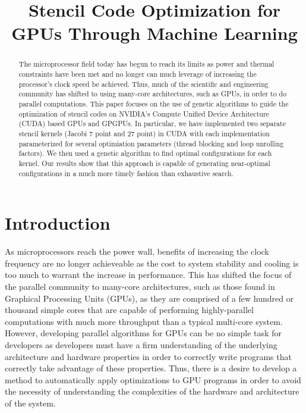 \documentclass[conference]{IEEEtran}
\begin{document}


\title{Stencil Code Optimization for GPUs Through Machine Learning}
\author{
}
\maketitle

\begin{abstract}
	The microprocessor field today has begun to reach its limits as power and thermal constraints have been met and no longer can much leverage of increasing the processor's clock speed be achieved. Thus, much of the scientific and engineering community has shifted to using many-core architectures, such as GPUs, in order to do parallel computations. This paper focuses on the use of genetic algorithms to guide the optimization of stencil codes on NVIDIA's Compute Unified Device Architecture (CUDA) based GPUs and GPGPUs. In particular, we have implemented two separate stencil kernels (Jacobi 7 point and 27 point) in CUDA with each implementation parameterized for several optimiation parameters (thread blocking and loop unrolling factors). We then used a genetic algorithm\cite{DEAP} to find optimal configurations for each kernel. Our results show that this approach is capable of generating near-optimal configurations in a much more timely fashion than exhaustive search.
\end{abstract}

\section{Introduction}
	As microprocessors reach the power wall, benefits of increasing the clock frequency are no longer achieveable as the cost to system stability and cooling is too much to warrant the increase in performance\cite{landscape}. This has shifted the focus of the parallel community to many-core architectures, such as those found in Graphical Processing Units (GPUs), as they are comprised of a few hundred or thousand simple cores that are capable of performing highly-parallel computations with much more throughput than a typical multi-core system. However, developing parallel algorithms for GPUs can be no simple task for developers as developers must have a firm understanding of the underlying architecture and hardware properties in order to correctly write programs that correctly take advantage of these properties. Thus, there is a desire to develop a method to automatically apply optimizations to GPU programs in order to avoid the necessity of understanding the complexities of the hardware and architecture of the system.
\end{document}
